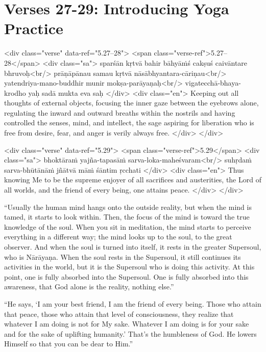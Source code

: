 \section{Verses 27-29: Introducing Yoga Practice}\label{sec-verses-27-29-introducing-yoga-practice}


\begin{html}
<div class="verse" data-ref="5.27–28">
  <span class="verse-ref">5.27–28</span>
  <div class="sa">
    sparśān kṛtvā bahir bāhyāṁś cakṣuś caivāntare bhruvoḥ<br/>
    prāṇāpānau samau kṛtvā nāsābhyantara-cāriṇau<br/>
    yatendriya-mano-buddhir munir mokṣa-parāyaṇaḥ<br/>
    vigatecchā-bhaya-krodho yaḥ sadā mukta eva saḥ
  </div>
  <div class="en">
    Keeping out all thoughts of external objects, focusing the inner gaze between the eyebrows alone, regulating the inward and outward breaths within the nostrils and having controlled the senses, mind, and intellect, the sage aspiring for liberation who is free from desire, fear, and anger is verily always free.
  </div>
</div>
\end{html}



\begin{html}
<div class="verse" data-ref="5.29">
  <span class="verse-ref">5.29</span>
  <div class="sa">
    bhoktāraṁ yajña-tapasāṁ sarva-loka-maheśvaram<br/>
    suhṛdaṁ sarva-bhūtānāṁ jñātvā māṁ śāntim ṛcchati
  </div>
  <div class="en">
    Thus knowing Me to be the supreme enjoyer of all sacrifices and austerities, the Lord of all worlds, and the friend of every being, one attains peace.
  </div>
</div>
\end{html}


\enquote{Usually the human mind hangs onto the outside reality, but when the mind is tamed, it starts to look within. Then, the focus of the mind is toward the true knowledge of the soul. When you sit in meditation, the mind starts to perceive everything in a different way; the mind looks up to the soul, to the great observer. And when the soul is turned into itself, it rests in the greater Supersoul, who is Nārāyaṇa. When the soul rests in the Supersoul, it still continues its activities in the world, but it is the Supersoul who is doing this activity. At this point, one is fully absorbed into the Supersoul. One is fully absorbed into this awareness, that God alone is the reality, nothing else.}

\enquote{He says, \enquote{I am your best friend, I am the friend of every being. Those who attain that peace, those who attain that level of consciousness, they realize that whatever I am doing is not for My sake. Whatever I am doing is for your sake and for the sake of uplifting humanity.} That’s the humbleness of God. He lowers Himself so that you can be dear to Him.}
